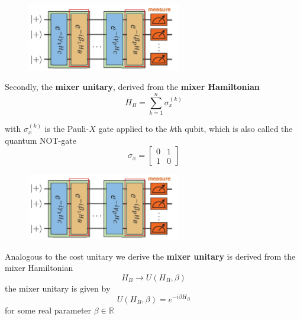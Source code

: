 \documentclass{beamer}
\begin{document}
{\begin{frame}[t]
\begin{figure}[t]
	\includegraphics[width=0.6\textwidth]{figures/qaoa_idea_edit_3}
\end{figure}
\vspace{20px}
Secondly, the \textbf{mixer unitary}, derived from the \textbf{mixer Hamiltonian}
\begin{equation}
H_B = \sum_{k = 1}^{n} \sigma_x^{(k)}
\end{equation}

with $\sigma_x^{(k)}$ is the Pauli-$X$ gate applied to the $k$th qubit, which is also called the quantum NOT-gate
\begin{equation}
	\sigma_x = \begin{bmatrix}
	0 & 1 \\
	1 & 0 
	\end{bmatrix}
\end{equation}
\end{frame}

\begin{frame}[t]
\begin{figure}[t]
	\includegraphics[width=0.6\textwidth]{figures/qaoa_idea_edit_3}
\end{figure}
\vspace{20px}
Analogous to the cost unitary we derive the \textbf{mixer unitary} is derived from the mixer Hamiltonian
\begin{equation}
	H_B \longrightarrow U(H_B,\beta)
\end{equation} 
the mixer unitary is given by
\begin{equation}
	U(H_B,\beta) = e^{-i\beta H_B}
\end{equation}
for some real parameter $\beta \in \mathbb{R}$
\end{frame}

}
\end{document}
